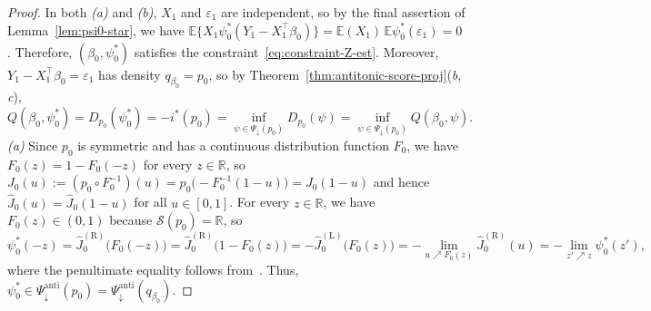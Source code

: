 \documentclass[a4paper]{article}
\newcommand{\R}{\mathbb{R}}
\newcommand{\E}{\mathbb{E}}
\theoremstyle{definition}
\begin{document}
\begin{proof}
In both \textit{(a)} and \textit{(b)}, $X_1$ and $\varepsilon_1$ are independent, so by the final assertion of Lemma~\ref{lem:psi0-star}, we have $\E\bigl\{X_1\psi_0^*(Y_1 - X_1^\top\beta_0)\bigr\} = \E(X_1)\,\E\psi_0^*(\varepsilon_1) = 0$. Therefore, $(\beta_0,\psi_0^*)$ satisfies the constraint~\eqref{eq:constraint-Z-est}. Moreover, $Y_1 - X_1^\top\beta_0 = \varepsilon_1$ has density $q_{\beta_0} = p_0$, so by Theorem~\ref{thm:antitonic-score-proj}(\emph{b},\,\emph{c}),
\[
Q(\beta_0,\psi_0^*) = D_{p_0}(\psi_0^*) = -i^*(p_0) = \inf_{\psi \in \Psi_\downarrow(p_0)} D_{p_0}(\psi) = \inf_{\psi \in \Psi_\downarrow(p_0)} Q(\beta_0,\psi).
\]
\noindent
\emph{(a)} Since $p_0$ is symmetric and has a continuous distribution function $F_0$, we have $F_0(z) = 1 - F_0(-z)$ for every $z \in \R$, so $J_0(u) := (p_0 \circ F_0^{-1})(u) = p_0\bigl(-F_0^{-1}(1 - u)\bigr) = J_0(1 - u)$ and hence $\hat{J}_0(u) = \hat{J}_0(1 - u)$ for all $u \in [0,1]$. For every $z \in \R$, we have $F_0(z) \in (0,1)$ because $\mathcal{S}(p_0) = \R$, so
\begin{equation}
\label{eq:psi0star-antisym}
\psi_0^*(-z) = \hat{J}_0^{(\mathrm{R})}\bigl(F_0(-z)\bigr) = \hat{J}_0^{(\mathrm{R})}\bigl(1 - F_0(z)\bigr) = -\hat{J}_0^{(\mathrm{L})}\bigl(F_0(z)\bigr) = -\lim_{u \nearrow F_0(z)}\hat{J}_0^{(\mathrm{R})}(u) = -\lim_{z' \nearrow z}\psi_0^*(z'),
\end{equation}
where the penultimate equality follows from~\citet[Theorem~24.1]{rockafellar97convex}. Thus, $\psi_0^* \in \Psi_\downarrow^{\mathrm{anti}}(p_0) = \Psi_\downarrow^{\mathrm{anti}}(q_{\beta_0})$.


\end{proof}
\end{document}

